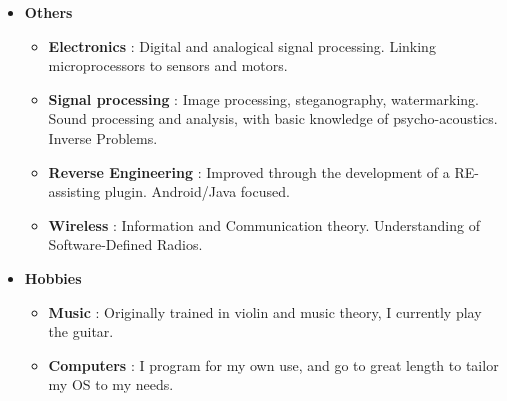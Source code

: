 \documentclass[11pt,a4paper,sans]{moderncv}        %
\begin{document}
\begin{itemize}[itemsep=0em, topsep=0em, parsep=0em]
\item \textbf{Others}
\begin{itemize}[itemsep=0em, topsep=0em, parsep=0em]
\item \textbf{Electronics} : Digital and analogical signal processing. Linking microprocessors to sensors and motors.
\item \textbf{Signal processing} : Image processing, steganography, watermarking. Sound processing and analysis, with basic knowledge of psycho-acoustics. Inverse Problems.
\item \textbf{Reverse Engineering} : Improved through the development of a RE-assisting plugin. Android/Java focused.
\item \textbf{Wireless} : Information and Communication theory. Understanding of Software-Defined Radios.
\end{itemize}

\vspace{6pt}

\item \textbf{Hobbies}
\begin{itemize}[itemsep=0em, topsep=0em, parsep=0em]
\item \textbf{Music} : Originally trained in violin and music theory, I currently play the guitar.
\item \textbf{Computers} : I program for my own use, and go to great length to tailor my OS to my needs.
\end{itemize}
\end{itemize}


\nocite{*}



\end{document}
